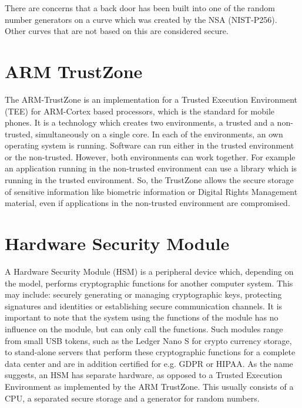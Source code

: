 \documentclass[12pt,oneside,a4paper,parskip]{scrbook}
\begin{document}
There are concerns that a back door has been built into one of the random number generators on a curve which was created by the NSA (NIST-P256). Other curves that are not based on this are considered secure. 
\parencite{schneier_essays_2007}

\section{ARM TrustZone}
\label{arm:TrustZone}

The ARM-TrustZone is an implementation for a Trusted Execution Environment (TEE) for ARM-Cortex based processors, which is the standard for mobile phones. It is a technology which creates two environments, a trusted and a non-trusted, simultaneously on a single core. In each of the environments, an own operating system is running. Software can run either in the trusted environment or the non-trusted. However, both environments can work together. For example an application running in the non-trusted environment can use a library which is running in the trusted environment. So, the TrustZone allows the secure storage of sensitive information like biometric information or Digital Rights Management material, even if applications in the non-trusted environment are compromised.
\parencite{fowler_trustzone_2017}

\section{Hardware Security Module}
\label{sec:HSM}

A Hardware Security Module (HSM) is a peripheral device which, depending on the model, performs cryptographic functions for another computer system. This may include: securely generating or managing cryptographic keys, protecting signatures and identities or establishing secure communication channels. It is important to note that the system using the functions of the module has no influence on the module, but can only call the functions. Such modules range from small USB tokens, such as the Ledger Nano S for crypto currency storage, to stand-alone servers that perform these cryptographic functions for a complete data center and are in addition certified for e.g. GDPR or HIPAA. As the name suggests, an HSM has separate hardware, as opposed to a Trusted Execution Environment as implemented by the ARM TrustZone. This usually consists of a CPU, a separated secure storage and a generator for random numbers.
\parencite{sustek_hardware_2011}
\end{document}
